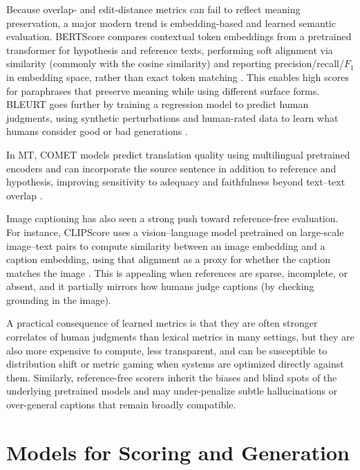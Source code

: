 Because overlap- and edit-distance metrics can fail to reflect meaning preservation, a major modern trend is embedding-based and learned semantic evaluation. BERTScore compares contextual token embeddings from a pretrained transformer for hypothesis and reference texts, performing soft alignment via similarity (commonly with the cosine similarity) and reporting precision/recall/$F_1$ in embedding space, rather than exact token matching \cite{zhang-etal-2019-bertscore}. This enables high scores for paraphrases that preserve meaning while using different surface forms. BLEURT goes further by training a regression model to predict human judgments, using synthetic perturbations and human-rated data to learn what humans consider good or bad generations \cite{sellam-etal-2020-bleurt}. 

In MT, COMET models predict translation quality using multilingual pretrained encoders and can incorporate the source sentence in addition to reference and hypothesis, improving sensitivity to adequacy and faithfulness beyond text--text overlap \cite{rei-etal-2020-comet}.

Image captioning has also seen a strong push toward reference-free evaluation. For instance, CLIPScore uses a vision--language model pretrained on large-scale image--text pairs to compute similarity between an image embedding and a caption embedding, using that alignment as a proxy for whether the caption matches the image \cite{hessel-etal-2021-clipscore}. This is appealing when references are sparse, incomplete, or absent, and it partially mirrors how humans judge captions (by checking grounding in the image). 

A practical consequence of learned metrics is that they are often stronger correlates of human judgments than lexical metrics in many settings, but they are also more expensive to compute, less transparent, and can be susceptible to distribution shift or metric gaming when systems are optimized directly against them.
Similarly, reference-free scorers inherit the biases and blind spots of the underlying pretrained models and may under-penalize subtle hallucinations or over-general captions that remain broadly compatible.






\section{Models for Scoring and Generation}

